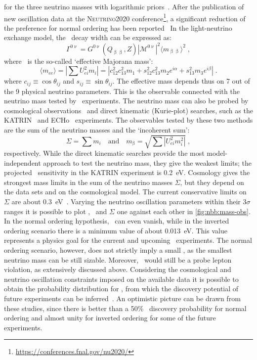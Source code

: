 for the three neutrino masses with logarithmic priors~\cite{Gariazzo2018}. After the
publication of new oscillation data at the \textsc{Neutrino2020}
conference\footnote{\url{https://conferences.fnal.gov/nu2020/}}, a significant reduction
of the preference for normal ordering has been reported~\cite{Kelly2020, Esteban2020}
\newpar
In the light-neutrino exchange model, the \onbb\ decay width can be expressed as:
\begin{equation}\label{eq:nbb:0nudecayrate}
  \Gamma^{0\upnu} = G^{0\upnu}(Q_{\upbeta\upbeta}, Z)
                  |\mathcal{M}^{0\upnu}|^2
                  \langle{m_{\upbeta\upbeta}}\rangle^2 \;,
\end{equation}
where \mbb\ is the so-called `effective Majorana mass':
\[
  \langle m_{ee} \rangle = \left| \sum U_{ei}^2 m_i \right|
                         = |c^2_{12} c^2_{13} m_1
                            + s^2_{12} c^2_{13} m_2 e^{i\alpha}
                            + s^2_{13} m_3 e^{i\beta}| \;.
\]
where $c_{ij} \equiv \cos{\theta_{ij}}$ and $s_{ij} \equiv \sin{\theta_{ij}}$.  The
effective mass depends thus on 7 out of the 9 physical neutrino parameters.  This is the
observable connected with the neutrino mass tested by \onbb\ experiments.  The neutrino
mass can also be probed by cosmological observations~\cite{Gerbino2018} and direct
kinematic (Kurie-plot) searches, such as the KATRIN~\cite{Aker2019} and
ECHo~\cite{Gastaldo2018} experiments.  The observables tested by these two methods are the
sum of the neutrino masses and the `incoherent sum':
\[
  \Sigma = \sum m_i \quad \text{and} \quad m_{\upbeta}
         = \sqrt{\sum |U_{ei}^2 m_i^2|} \;,
\]
respectively. While the direct kinematic searches provide the most model-independent
approach to test the neutrino mass, they give the weakest limits; the projected \mb\
sensitivity in the KATRIN experiment is 0.2~eV.  Cosmology gives the strongest mass limits
in the sum of the neutrino masses $\Sigma$, but they depend on the data sets and on the
cosmological model. The current conservative limits on $\Sigma$ are about
0.3~eV~\cite{Aghanim2018}.
\newpar
Varying the neutrino oscillation parameters within their $3\sigma$ ranges it is possible
to plot \mbb, \mb\ and $\Sigma$ one against each other in \cref{fig:nbb:mass-obs}. In the
normal ordering hypothesis, \mbb\ can even vanish, while in the inverted ordering scenario
there is a minimum value of about 0.013~eV. This value represents a physics goal for the
current and upcoming \onbb\ experiments. The normal ordering scenario, however, does not
strictly imply a small \mbb, as the smallest neutrino mass can be still sizable. Moreover,
\onbb\ would still be a probe lepton violation, as extensively discussed above.
\newpar
Considering the cosmological and neutrino oscillation constraints imposed on the available
data it is possible to obtain the probability distribution for \mbb, from which the
discovery potential of future experiments can be inferred~\cite{Caldwell2017,
Agostini2017a, Ge2017}. An optimistic picture can be drawn from these studies, since there
is better than a 50\% \onbb\ discovery probability for normal ordering and almost unity
for inverted ordering for some of the future experiments.

